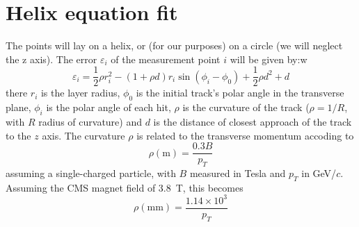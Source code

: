 \documentclass[10pt,a4paper]{article}
\begin{document}
\section{Helix equation fit}
The points will lay on a helix, or (for our purposes) on a circle (we will neglect the z axis).
The error $\varepsilon_i$ of the measurement point $i$ will be given by:w
\begin{equation}
\varepsilon_i = \frac 1 2 \rho r_i^2 - (1 + \rho d) r_i \sin(\phi_i-\phi_0) + \frac 1 2 \rho d^2 + d
\end{equation}
there $r_i$ is the layer radius, $\phi_0$ is the initial track's polar angle in the transverse plane, $\phi_i$ is
the polar angle of each hit, $\rho$ is the curvature of the track ($\rho=1/R$, with $R$ radius of curvature)
and $d$ is the distance of closest approach of the track to the $z$ axis.
The curvature $\rho$ is related to the transverse momentum accoding to
\begin{equation}
\rho (\mathrm{m}) = \frac {0.3 B} {p_T} 
\end{equation}
assuming a single-charged particle, with $B$ measured in Tesla and $p_T$ in GeV/$c$. Assuming the
CMS magnet field of 3.8~T, this becomes
\begin{equation}
\rho (\mathrm{mm}) = \frac {1.14\times 10^3} {p_T} 
\end{equation}
\end{document}
